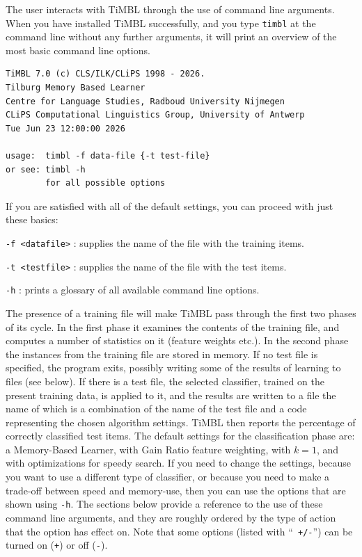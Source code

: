 \documentclass{book}
\begin{document}
The user interacts with TiMBL through the use of command line arguments.
When you have installed TiMBL successfully, and you type {\tt timbl} at the
command line without any further arguments, it will print an overview
of the most basic command line options.

{\footnotesize
\begin{verbatim}
TiMBL 7.0 (c) CLS/ILK/CLiPS 1998 - 2026.
Tilburg Memory Based Learner
Centre for Language Studies, Radboud University Nijmegen
CLiPS Computational Linguistics Group, University of Antwerp
Tue Jun 23 12:00:00 2026

usage:  timbl -f data-file {-t test-file}
or see: timbl -h
        for all possible options
\end{verbatim}
}

If you are satisfied with all of the default settings, you can proceed
with just these basics:

\begin{description}

\item {\tt -f <datafile>} : supplies the name of the file with the
training items.
\item {\tt -t <testfile>} : supplies the name of the file with the
test items.
\item {\tt -h} : prints a glossary of all available command line
options.

\end{description}

The presence of a training file will make TiMBL pass through the first
two phases of its cycle. In the first phase it examines the contents
of the training file, and computes a number of statistics on it
(feature weights etc.). In the second phase the instances from the
training file are stored in memory. If no test file is specified, the
program exits, possibly writing some of the results of learning to
files (see below). If there is a test file, the selected classifier,
trained on the present training data, is applied to it, and the
results are written to a file the name of which is a combination of
the name of the test file and a code representing the chosen algorithm
settings. TiMBL then reports the percentage of correctly classified
test items. The default settings for the classification phase are: a
Memory-Based Learner, with Gain Ratio feature weighting, with $k=1$,
and with optimizations for speedy search. If you need to change the
settings, because you want to use a different type of classifier, or
because you need to make a trade-off between speed and memory-use,
then you can use the options that are shown using {\tt -h}. The
sections below provide a reference to the use of these command line
arguments, and they are roughly ordered by the type of action that the
option has effect on. Note that some options (listed with ``{\tt
  +/-}'') can be turned on ({\tt +}) or off ({\tt -}).
\end{document}
